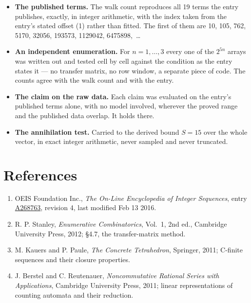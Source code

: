\documentclass[11pt]{article}
\theoremstyle{definition}
\begin{document}
\begin{itemize}

\item {\bfseries The published terms.} The walk count reproduces all 19 terms the entry publishes, exactly, in integer arithmetic, with the index taken from the entry's stated offset (1) rather than fitted. The first of them are 10, 105, 762, 5170, 32056, 193573, 1129042, 6475898,~\dots

\item {\bfseries An independent enumeration.} For $n = 1,\dots,3$ every one of the $2^{5n}$ arrays was written out and tested cell by cell against the condition as the entry states it --- no transfer matrix, no row window, a separate piece of code. The counts agree with the walk count and with the entry.

\item {\bfseries The claim on the raw data.} Each claim was evaluated on the entry's published terms alone, with no model involved, wherever the proved range and the published data overlap. It holds there.

\item {\bfseries The annihilation test.} Carried to the derived bound $S = 15$ over the whole vector, in exact integer arithmetic, never sampled and never truncated.

\end{itemize}

\section{References}

\begin{enumerate}

\item OEIS Foundation Inc., \emph{The On-Line Encyclopedia of Integer Sequences}, entry \href{https://oeis.org/A268763}{A268763}, revision 4, last modified Feb 13 2016.

\item R. P. Stanley, \emph{Enumerative Combinatorics}, Vol.~1, 2nd ed., Cambridge University Press, 2012; \S4.7, the transfer-matrix method.

\item M. Kauers and P. Paule, \emph{The Concrete Tetrahedron}, Springer, 2011; C-finite sequences and their closure properties.

\item J. Berstel and C. Reutenauer, \emph{Noncommutative Rational Series with Applications}, Cambridge University Press, 2011; linear representations of counting automata and their reduction.

\end{enumerate}
\end{document}
